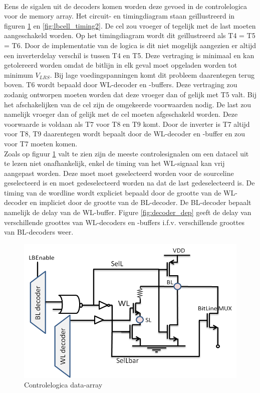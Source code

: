 \paragraph{}
Eens de sigalen uit de decoders komen worden deze gevoed in de controlelogica voor de memory array. Het circuit- en timingdiagram staan geïllustreerd in figuren \ref{fig:lbcell_timing1} en \ref{fig:lbcell_timing2}. De cel zou vroeger of tegelijk met de last moeten aangeschakeld worden. Op het timingdiagram wordt dit geïllustreerd als T4 = T5 = T6. Door de implementatie van de logica is dit niet mogelijk aangezien er altijd een inverterdelay verschil is tussen T4 en T5. Deze vertraging is minimaal en kan getolereerd worden omdat de bitlijn in elk geval moet opgeladen worden tot minimum $V_{LRS}$. Bij lage voedingspanningen komt dit probleem daarentegen terug boven. T6 wordt bepaald door WL-decoder en -buffers. Deze vertraging zou zodanig ontworpen moeten worden dat deze vroeger dan of gelijk met T5 valt. Bij het afschakelijken van de cel zijn de omgekeerde voorwaarden nodig. De last zou namelijk vroeger dan of gelijk met de cel moeten afgeschakeld worden. Deze voorwaarde is voldaan als T7 voor T8 en T9 komt. Door de inverter is T7 altijd voor T8, T9 daarentegen wordt bepaalt door de WL-decoder en -buffer en zou voor T7 moeten komen. \\
Zoals op figuur \ref{fig:lbcell_timing1} valt te zien zijn de meeste controlesignalen om een datacel uit te lezen niet onafhankelijk, enkel de timing van het WL-signaal kan vrij aangepast worden. Deze moet moet geselecteerd worden voor de sourceline geselecteerd is en moet gedeselecteerd worden na dat de last gedeselecteerd is. De timing van de wordline wordt expliciet bepaald door de grootte van de WL-decoder en impliciet door de grootte van de BL-decoder. De BL-decoder bepaalt namelijk de delay van de WL-buffer. Figure \ref{fig:decoder_dep} geeft de delay van verschillende groottes van WL-decoders en -buffers i.f.v. verschillende groottes van BL-decoders weer.

\begin{figure}[!ht]
  \centering
  \includegraphics[scale=0.6]{../fig/hfdstk-timing-lbcell1.png}
  \caption{Controlelogica data-array}
  \label{fig:lbcell_timing1}
\end{figure}

